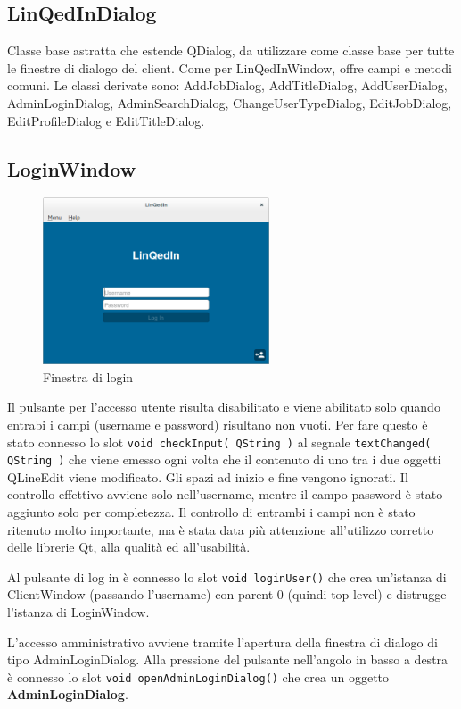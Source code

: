 \documentclass[a4paper]{article}
\begin{document}
\subsection*{LinQedInDialog}
Classe base astratta che estende QDialog, da utilizzare come classe base per tutte le finestre di dialogo del client. Come per LinQedInWindow, offre campi e metodi comuni. Le classi derivate sono: AddJobDialog, AddTitleDialog, AddUserDialog, AdminLoginDialog, AdminSearchDialog, ChangeUserTypeDialog, EditJobDialog, EditProfileDialog e EditTitleDialog.

\subsection*{LoginWindow}
\begin{figure}[!ht]
\centering
\includegraphics[width=0.6\textwidth]{LoginWindow.png}
\caption{Finestra di login}
\end{figure}

Il pulsante per l'accesso utente risulta disabilitato e viene abilitato solo quando entrabi i campi (username e password) risultano non vuoti. Per fare questo è stato connesso lo slot \texttt{void checkInput( QString )} al segnale \texttt{textChanged( QString )} che viene emesso ogni volta che il contenuto di uno tra i due oggetti QLineEdit viene modificato. Gli spazi ad inizio e fine vengono ignorati. Il controllo effettivo avviene solo nell'username, mentre il campo password è stato aggiunto solo per completezza. Il controllo di entrambi i campi non è stato ritenuto molto importante, ma è stata data più attenzione all'utilizzo corretto delle librerie Qt, alla qualità ed all'usabilità.

Al pulsante di log in è connesso lo slot \texttt{void loginUser()} che crea un'istanza di ClientWindow (passando l'username) con parent 0 (quindi top-level) e distrugge l'istanza di LoginWindow.

L'accesso amministrativo avviene tramite l'apertura della finestra di dialogo di tipo AdminLoginDialog. Alla pressione del pulsante nell'angolo in basso a destra è connesso lo slot \texttt{void openAdminLoginDialog()} che crea un oggetto \textbf{AdminLoginDialog}.
\end{document}
